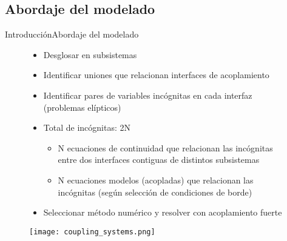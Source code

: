 \subsection{Abordaje del modelado}
\begin{frame}{Introducción}{Abordaje del modelado}

  \begin{figure}[ht]
    \begin{minipage}{0.58\linewidth}
      \begin{itemize}
      \item <2-> Desglosar en subsistemas
      \item <3-> Identificar uniones que relacionan interfaces de acoplamiento
      \item <4-> Identificar pares de variables incógnitas en cada interfaz (problemas elípticos)
      \item <5-> Total de incógnitas: 2N
        \begin{itemize}
        \item <6-> N ecuaciones de continuidad que relacionan las incógnitas entre dos interfaces contiguas de distintos subsistemas
        \item <7-> N ecuaciones modelos (acopladas) que relacionan las incógnitas (según selección de condiciones de borde)
        \end{itemize} 
      \item <8-> Seleccionar método numérico y resolver con acoplamiento fuerte
      \end{itemize}    
    \end{minipage}
    \begin{minipage}{0.4\linewidth}
      \centering
      \texttt{[image: coupling\_systems.png]}
      \label{esquma-DDM}
    \end{minipage}
    \label{aasdasd}
  \end{figure}
  
  
\end{frame}



